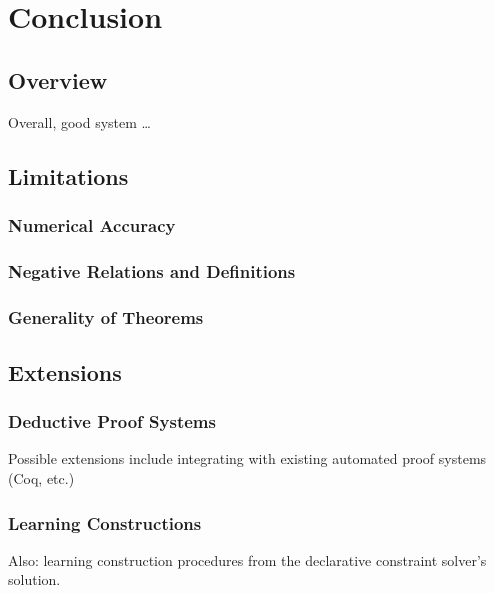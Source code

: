 \chapter{Conclusion}
\label{chap:conclusion}

\section{Overview}

Overall, good system \ldots

\section{Limitations}

\subsection{Numerical Accuracy}

\subsection{Negative Relations and Definitions}

\subsection{Generality of Theorems}

\section{Extensions}

\subsection{Deductive Proof Systems}

Possible extensions include integrating with existing automated proof
systems (Coq, etc.)

\subsection{Learning Constructions}

Also: learning construction procedures from the declarative constraint
solver's solution.

